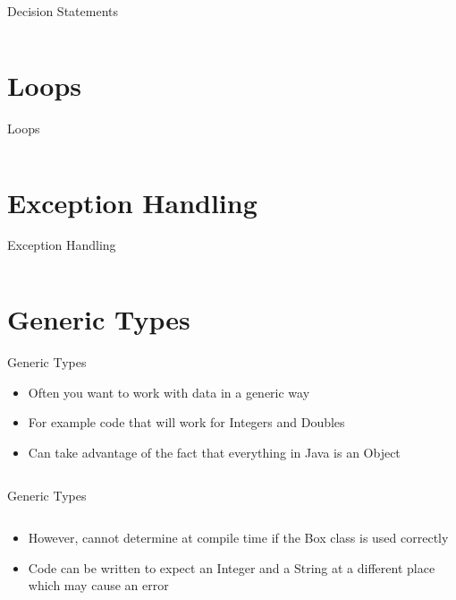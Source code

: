 \documentclass{beamer}
\begin{document}
\begin{frame}{Decision Statements}
    \inputminted[fontsize=\footnotesize]{java}{DecisionStatements.java}
\end{frame}

\section{Loops}
\begin{frame}{Loops}
    \inputminted{java}{Loops.java}
\end{frame}

\section{Exception Handling}
\begin{frame}{Exception Handling}
\inputminted[]{java}{ExceptionHandling.java}    
\end{frame}

\section{Generic Types}
\begin{frame}{Generic Types}
\begin{itemize}
    \item Often you want to work with data in a generic way
    \item For example code that will work for Integers and Doubles
    \item Can take advantage of the fact that everything in Java is an Object
\end{itemize}

\inputminted[]{java}{BoxNonGeneric.java}
\end{frame}

\begin{frame}{Generic Types}
    \inputminted[]{java}{BoxNonGeneric.java}
    \begin{itemize}
        \item However, cannot determine at compile time if the Box class is used correctly
        \item Code can be written to expect an Integer and a String at a different place which may cause an error
    \end{itemize}
\end{frame}
\end{document}
